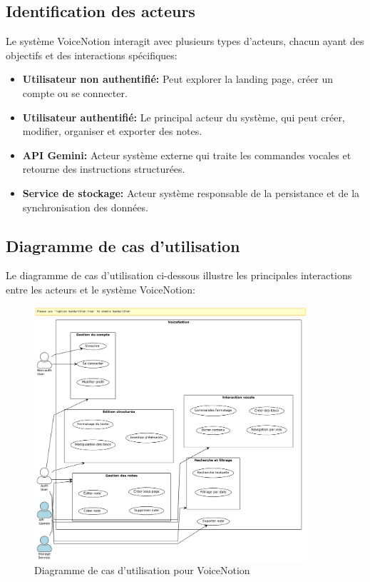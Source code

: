 \subsection{Identification des acteurs}

Le système VoiceNotion interagit avec plusieurs types d'acteurs, chacun ayant des objectifs et des interactions spécifiques:

\begin{itemize}
    \item \textbf{Utilisateur non authentifié:} Peut explorer la landing page, créer un compte ou se connecter.
    
    \item \textbf{Utilisateur authentifié:} Le principal acteur du système, qui peut créer, modifier, organiser et exporter des notes.
    
    \item \textbf{API Gemini:} Acteur système externe qui traite les commandes vocales et retourne des instructions structurées.
    
    \item \textbf{Service de stockage:} Acteur système responsable de la persistance et de la synchronisation des données.
\end{itemize}

\subsection{Diagramme de cas d'utilisation}

Le diagramme de cas d'utilisation ci-dessous illustre les principales interactions entre les acteurs et le système VoiceNotion:

\begin{figure}[H]
    \centering
    \includegraphics[width=0.9\textwidth]{assets/docs/voicenotion_use_case.png}
    \caption{Diagramme de cas d'utilisation pour VoiceNotion}
    \label{fig:use_case_diagram}
\end{figure}

